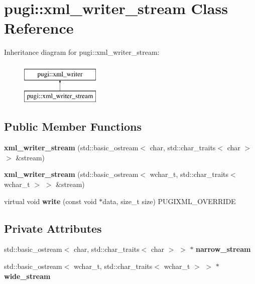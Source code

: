 \hypertarget{classpugi_1_1xml__writer__stream}{}\section{pugi\+:\+:xml\+\_\+writer\+\_\+stream Class Reference}
\label{classpugi_1_1xml__writer__stream}
Inheritance diagram for pugi\+:\+:xml\+\_\+writer\+\_\+stream\+:\begin{figure}[H]
\begin{center}
\leavevmode
\includegraphics[height=2.000000cm]{classpugi_1_1xml__writer__stream}
\end{center}
\end{figure}
\subsection*{Public Member Functions}
\begin{DoxyCompactItemize}
\item 
\mbox{\label{classpugi_1_1xml__writer__stream_a259c28368c08378e15cf28b35a1dcd9a}} 
{\bfseries xml\+\_\+writer\+\_\+stream} (std\+::basic\+\_\+ostream$<$ char, std\+::char\+\_\+traits$<$ char $>$ $>$ \&stream)
\item 
\mbox{\label{classpugi_1_1xml__writer__stream_afa342cf0bb3a0bd6ee3d47550ad23333}} 
{\bfseries xml\+\_\+writer\+\_\+stream} (std\+::basic\+\_\+ostream$<$ wchar\+\_\+t, std\+::char\+\_\+traits$<$ wchar\+\_\+t $>$ $>$ \&stream)
\item 
\mbox{\label{classpugi_1_1xml__writer__stream_a331839df873b20fd6d32b25f3eeb5856}} 
virtual void {\bfseries write} (const void $\ast$data, size\+\_\+t size) P\+U\+G\+I\+X\+M\+L\+\_\+\+O\+V\+E\+R\+R\+I\+DE
\end{DoxyCompactItemize}
\subsection*{Private Attributes}
\begin{DoxyCompactItemize}
\item 
\mbox{\label{classpugi_1_1xml__writer__stream_adb73530fd7dbe3909829e8b21207c073}} 
std\+::basic\+\_\+ostream$<$ char, std\+::char\+\_\+traits$<$ char $>$ $>$ $\ast$ {\bfseries narrow\+\_\+stream}
\item 
\mbox{\label{classpugi_1_1xml__writer__stream_a2a2d6d877beda21263dc36e37a40ac71}} 
std\+::basic\+\_\+ostream$<$ wchar\+\_\+t, std\+::char\+\_\+traits$<$ wchar\+\_\+t $>$ $>$ $\ast$ {\bfseries wide\+\_\+stream}
\end{DoxyCompactItemize}



